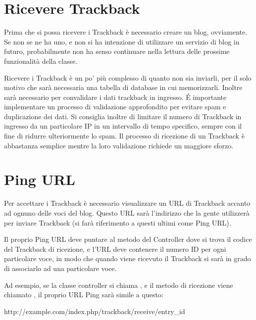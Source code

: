 
\section*{Ricevere Trackback}

Prima che si possa ricevere i Trackback è necessario creare un blog, ovviamente. Se non se ne ha uno, e non si ha intenzione di utilizzare un servizio di blog in futuro, probabilmente non ha senso continuare nella lettura delle prossime funzionalità della classe.

Ricevere i Trackback è un po' più complesso di quanto non sia inviarli, per il solo motivo che sarà necessaria una tabella di database in cui memorizzarli. Inoltre sarà necessario per convalidare i dati trackback in ingresso. \'E importante implementare un processo di validazione approfondito per evitare spam e duplicazione dei dati. Si consiglia inoltre di limitare il numero di Trackback in ingresso da un particolare IP in un intervallo di tempo specifico, sempre con il fine di ridurre ulteriormente lo spam. Il processo di ricezione di un Trackback è abbastanza semplice mentre la loro validazione richiede un maggiore sforzo.

\section*{Ping URL}

Per accettare i Trackback è necessario visualizzare un \ac{URL} di Trackback accanto ad ognuno delle voci del blog. Questo \ac{URL} sarà l'indirizzo che la gente utilizzerà per inviare Trackback (si farà riferimento a questi ultimi come Ping URL). 

Il proprio Ping URL deve puntare al metodo del Controller dove si trova il codice del Trackback di ricezione, e l'URL deve contenere il numero ID per ogni particolare voce, in modo che quando viene ricevuto il Trackback si sarà in grado di associarlo ad una particolare voce. 

Ad esempio, se la classe controller si chiama , e il metodo di ricezione viene chiamato , il proprio URL Ping sarà simile a questo:

\begin{code}
http://example.com/index.php/trackback/receive/entry_id
\end{code}

